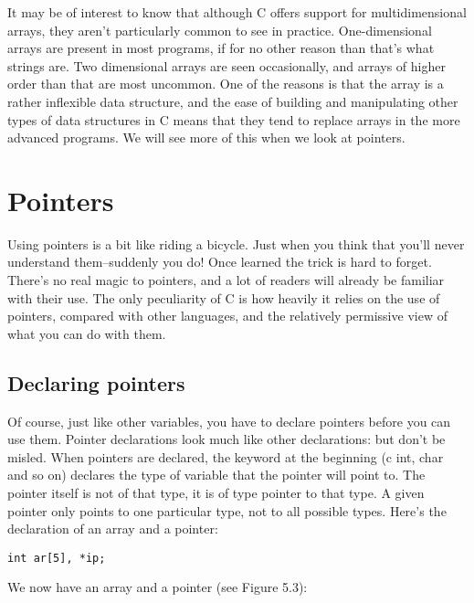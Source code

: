    It may be of interest to know that although C offers support for
    multidimensional arrays, they aren't particularly common to see in
    practice. One-dimensional arrays are present in most programs, if for no
    other reason than that's what strings are. Two dimensional arrays are
    seen occasionally, and arrays of higher order than that are most
    uncommon. One of the reasons is that the array is a rather inflexible
    data structure, and the ease of building and manipulating other types of
    data structures in C means that they tend to replace arrays in the more
    advanced programs. We will see more of this when we look at
    pointers.


  

 
        \section{Pointers}
        

  

  Using pointers is a bit like riding a bicycle. Just when you think that
   you'll never understand them--suddenly you do! Once learned the trick
   is hard to forget. There's no real magic to pointers, and a lot of
   readers will already be familiar with their use. The only peculiarity of
   C is how heavily it relies on the use of pointers, compared with other
   languages, and the relatively permissive view of what you can do with
   them.


  \subsection{Declaring pointers}
   

   Of course, just like other variables, you have to declare pointers
    before you can use them. Pointer declarations look much like other
    declarations: but don't be misled. When pointers are declared, the
    keyword at the beginning (c int, char and so on) declares the type of
    variable that the pointer will point to. The pointer itself is not of
    that type, it is of type pointer to that type. A given pointer only
    points to one particular type, not to all possible types. Here's the
    declaration of an array and a pointer:


   \begin{Verbatim}
int ar[5], *ip;
\end{Verbatim}

   We now have an array and a pointer (see Figure 5.3):


